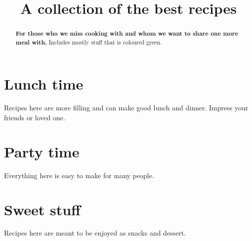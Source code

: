 \documentclass[%
a4paper,
11pt
]{article}
\begin{document}
\title{A collection of the best recipes}
\maketitle

\begin{abstract}
    \noindent \textbf{For those who we miss cooking with and whom we want to share one more meal with.} Includes mostly stuff that is coloured green.
\end{abstract}

\tableofcontents

\pagebreak


\section{Lunch time}
Recipes here are more filling and can make good lunch and dinner. Impress your friends or loved one.








\section{Party time}
Everything here is easy to make for many people.

\section{Sweet stuff}
Recipes here are meant to be enjoyed as snacks and dessert.


\end{document}
